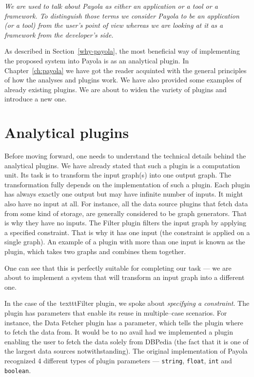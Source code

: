 \emph{We are used to talk about Payola as either an application or a tool or a framework. To
distinguish those terms we consider Payola to be an application (or a tool) from the user’s
point of view whereas we are looking at it as a framework from the developer’s side.}

As described in Section~\ref{why-payola}, the most beneficial way of 
implementing the proposed system into Payola is as an analytical plugin. In Chapter~\ref{ch:payola}
we have got the reader acquinted with the 
general principles of how the analyses and plugins work. We have also provided some examples 
of already existing plugins. We are about to widen the variety of plugins and 
introduce a new one.

\section{Analytical plugins}
Before moving forward, one needs to understand the technical 
details behind the analytical plugins. We have already stated that such a plugin is 
a computation unit. Its task is to transform the input graph(s) into one output 
graph. The transformation fully depends on the implementation of such a 
plugin. Each plugin has always exactly one output but may have infinite number of 
inputs. It might also have no input at all. For instance, all the data 
source plugins that fetch data from some kind of storage, are generally considered to be
graph generators. That is why they have no inputs. The Filter 
plugin filters the input graph by applying a specified constraint. That is why it 
has one input (the constraint is applied on a single graph).
An example of a plugin with more than one input is known as the~ 
plugin, which takes two graphs and combines them together.

One can see that this is perfectly suitable for completing our task --- we are about to 
implement a system that will transform an input graph into a different one.

In the case of the~texttt{Filter} plugin, we spoke about \emph{specifying a 
constraint}. The plugin has parameters that enable its reuse in multiple--case scenarios. For instance,
the Data Fetcher plugin has a parameter, which tells 
the plugin where to fetch the data from. It would be to no avail had we implemented a plugin
enabling the user to fetch the data solely from DBPedia (the fact that it is one of the largest data
sources notwithstanding).
The original implementation of Payola recognized 4 different types of plugin 
parameters --- \texttt{string}, \texttt{float}, \texttt{int} and \texttt{boolean}. 

